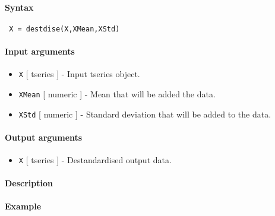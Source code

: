 


	\paragraph{Syntax}
 
 \begin{verbatim}
 X = destdise(X,XMean,XStd)
 \end{verbatim}
 
 \paragraph{Input arguments}
 
 \begin{itemize}
 \item
   \texttt{X} {[} tseries {]} - Input tseries object.
 \item
   \texttt{XMean} {[} numeric {]} - Mean that will be added the data.
 \item
   \texttt{XStd} {[} numeric {]} - Standard deviation that will be added
   to the data.
 \end{itemize}
 
 \paragraph{Output arguments}
 
 \begin{itemize}
 \item
   \texttt{X} {[} tseries {]} - Destandardised output data.
 \end{itemize}
 
 \paragraph{Description}
 
 \paragraph{Example}


